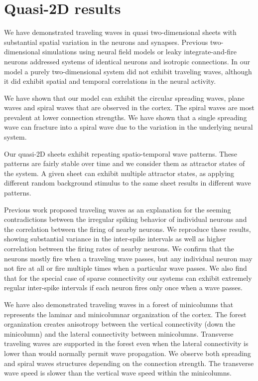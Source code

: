 \section{Quasi-2D results}
We have demonstrated traveling waves in quasi two-dimensional sheets with substantial spatial variation in the neurons and synapses.
Previous two-dimensional simulations using neural field models or leaky integrate-and-fire neurons addressed systems of identical neurons and isotropic connections.
In our model a purely two-dimensional system did not exhibit traveling waves, although it did exhibit spatial and temporal correlations in the neural activity.

We have shown that our model can exhibit the circular spreading waves, plane waves and spiral waves that are observed in the cortex.
The spiral waves are most prevalent at lower connection strengths.
We have shown that a single spreading wave can fracture into a spiral wave due to the variation in the underlying neural system.

Our quasi-2D sheets exhibit repeating spatio-temporal wave patterns.
These patterns are fairly stable over time and we consider them as attractor states of the system.
A given sheet can exhibit multiple attractor states, as applying different random background stimulus to the same sheet results in different wave patterns.

Previous work \citep{keane2015} proposed traveling waves as an explanation for the seeming contradictions between the irregular spiking behavior of individual neurons 
and the correlation between the firing of nearby neurons.
We reproduce these results, showing substantial variance in the inter-spike intervals as well as higher correlation between the firing rates of nearby neurons.
We confirm that the neurons mostly fire when a traveling wave passes, but any individual neuron may not fire at all or fire multiple times when a particular wave passes.
We also find that for the special case of sparse connectivity our systems can exhibit extremely regular inter-spike intervals if each neuron fires only once when a wave passes.

We have also demonstrated traveling waves in a forest of minicolumns that represents the laminar and minicolumnar organization of the cortex.
The forest organization creates anisotropy between the vertical connectivity (down the minicolumn) and the lateral connectivity between minicolumns.
Transverse traveling waves are supported in the forest even when the lateral connectivity is lower than would normally permit wave propagation.
We observe both spreading and spiral waves structures depending on the connection strength.
The transverse wave speed is slower than the vertical wave speed within the minicolumns.


